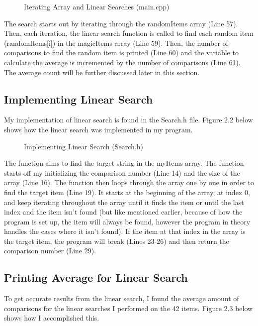 \documentclass[letterpaper, 10pt]{article}
\begin{document}
\begin{figure}[H]
  \centering
   
  \caption{Iterating Array and Linear Searches (main.cpp)}
  \label{fig:figure2.1}
\end{figure}

\noindent
The search starts out by iterating through the randomItems array (Line 57). Then, each iteration, the linear search function is called to find each random item (randomItems[i]) in the magicItems array (Line 59). Then, the number of comparisons to find the random item is printed (Line 60) and the variable to calculate the average is incremented by the number of comparisons (Line 61). The average count will be further discussed later in this section.

\subsection{Implementing Linear Search}
\noindent
My implementation of linear search is found in the Search.h file. Figure 2.2 below shows how the linear search was implemented in my program.

\begin{figure}[H]
  \centering
   
  \caption{Implementing Linear Search (Search.h)}
  \label{fig:figure2.2}
\end{figure}

\noindent
The function aims to find the target string in the myItems array. The function starts off my initializing the comparison number (Line 14) and the size of the array (Line 16). The function then loops through the array one by one in order to find the target item (Line 19). It starts at the beginning of the array, at index 0, and keep iterating throughout the array until it finds the item or until the last index and the item isn't found (but like mentioned earlier, because of how the program is set up, the item will always be found, however the program in theory handles the cases where it isn't found). If the item at that index in the array is the target item, the program will break (Lines 23-26) and then return the comparison number (Line 29).

\subsection{Printing Average for Linear Search}
\noindent
To get accurate results from the linear search, I found the average amount of comparisons for the linear searches I performed on the 42 items. Figure 2.3 below shows how I accomplished this.
\end{document}

